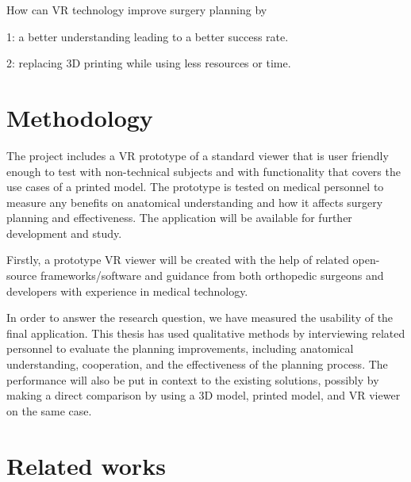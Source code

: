 \documentclass[a4paper]{report}
\begin{document}
How can VR technology improve surgery planning by

1: a better understanding leading to a better success rate.

2: replacing 3D printing while using less resources or time.

\section{Methodology}

The project includes a VR prototype of a standard viewer that is user friendly enough to test with non-technical subjects and with functionality that covers the use cases of a printed model.
The prototype is tested on medical personnel to measure any benefits on anatomical understanding and how it affects surgery planning and effectiveness. The application will be available for further development and study.

Firstly, a prototype VR viewer will be created with the help of related open-source frameworks/software and guidance from both orthopedic surgeons and developers with experience in medical technology.

In order to answer the research question, we have measured the usability of the final application. This thesis has used qualitative methods
by interviewing related personnel to evaluate the planning improvements, including anatomical understanding, cooperation, and the effectiveness of the planning process.
The performance will also be put in context to the existing solutions, possibly by making a direct comparison by using a 3D model, printed model, and VR viewer
on the same case.

\section{Related works}
\end{document}
